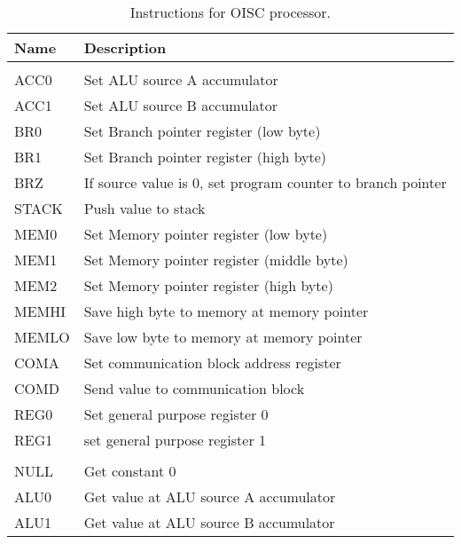 \begin{longtable}[h!]{| l | p{} |}
	\caption{Instructions for OISC processor.}
	\label{tab:oisc_instructions}\\
	
	\hline 
	\rowcolor[rgb]{0.82,0.82,0.82}
	Name & Description \\\hline
	\endhead		
	
	\arrayrulecolor{black}\hline
	\endfoot
	
	\multicolumn{2}{|c|}{
		\cellcolor[rgb]{0.7,0.7,1}\textit{Destination Addresses}} \\\hline
	\arrayrulecolor[rgb]{0.82,0.82,0.82}
	
	ACC0 & Set ALU source A accumulator \\
	ACC1 & Set ALU source B accumulator \\\hline
	BR0  & Set Branch pointer register (low byte) \\
	BR1  & Set Branch pointer register (high byte) \\
	BRZ  & If source value is 0, set program counter to branch pointer \\\hline
	STACK& Push value to stack \\
	MEM0 & Set Memory pointer register (low byte) \\
	MEM1 & Set Memory pointer register (middle byte) \\
	MEM2 & Set Memory pointer register (high byte) \\
	MEMHI& Save high byte to memory at memory pointer \\
	MEMLO& Save low byte to memory at memory pointer \\\hline
	COMA & Set communication block address register \\
	COMD & Send value to communication block \\\hline
	REG0 & Set general purpose register 0 \\
	REG1 & set general purpose register 1 \\
	
	\arrayrulecolor{black}\hline
	\multicolumn{2}{|c|}{
		\cellcolor[rgb]{0.7,0.7,1}\textit{Source Addresses}} \\\hline
	\arrayrulecolor[rgb]{0.82,0.82,0.82}
	
	NULL & Get constant 0 \\
	ALU0 & Get value at ALU source A accumulator \\
	ALU1 & Get value at ALU source B accumulator \\\hline
	

\end{longtable}
